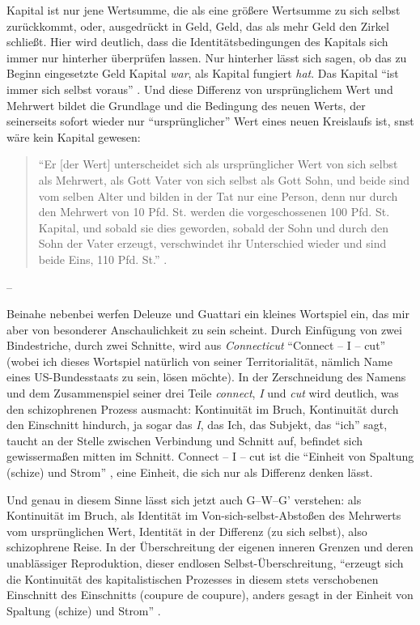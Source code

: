 \documentclass[12pt,
               DIV13,
               paper=a4,
               twoside=false,
               onehalfspacing,
               bibliography=totoc,
               toc=graduated,
               draft,
               ]{scrartcl}
\newcommand{\pc}[2]{\parencite[#1]{#2}}
\newcommand{\worries}[1]{\ifdraft{\textcolor{blue}{\texttt{(#1)}}}{}}
\newcommand{\gwg}{G--W--G'\xspace}
\begin{document}
Kapital ist nur jene Wertsumme, die als eine größere Wertsumme zu sich
selbst zurückkommt, oder, ausgedrückt in Geld, Geld, das als mehr Geld
den Zirkel schließt. \worries{Falte} Hier wird deutlich, dass die
Identitätsbedingungen des Kapitals sich immer nur hinterher überprüfen
lassen. Nur hinterher lässt sich sagen, ob das zu Beginn eingesetzte
Geld Kapital \emph{war}, als Kapital fungiert \emph{hat}. Das Kapital
"`ist immer sich selbst voraus"' \pc{125}{strauss}. Und diese
Differenz von ursprünglichem Wert und Mehrwert bildet die Grundlage
und die Bedingung des neuen Werts, der seinerseits sofort wieder nur
"`ursprünglicher"' Wert eines neuen Kreislaufs ist, snst wäre kein
Kapital gewesen:
%
\begin{spacing}{1}
\begin{quote}
"`Er [der Wert] unterscheidet sich als ursprünglicher
Wert von sich selbst als Mehrwert, als Gott Vater von sich selbst als
Gott Sohn, und beide sind vom selben Alter und bilden in der Tat nur
eine Person, denn nur durch den Mehrwert von 10 Pfd. St. werden die
vorgeschossenen 100 Pfd. St. Kapital, und sobald sie dies geworden,
sobald der Sohn und durch den Sohn der Vater erzeugt, verschwindet ihr
Unterschied wieder und sind beide Eins, 110 Pfd. St."' \pc{S. 169
f.}{kap}.
\end{quote}
\end{spacing}

--

Beinahe nebenbei werfen Deleuze und Guattari ein kleines Wortspiel
ein, das mir aber von besonderer Anschaulichkeit zu sein scheint.
Durch Einfügung von zwei Bindestriche, durch zwei Schnitte, wird aus
\emph{Connecticut} "`Connect -- I -- cut"' \pc{48}{ao} (wobei ich
dieses Wortspiel natürlich von seiner Territorialität, nämlich Name
eines US-Bundesstaats zu sein, lösen möchte). In der Zerschneidung des
Namens und dem Zusammenspiel seiner drei Teile \emph{connect},
\emph{I} und \emph{cut} wird deutlich, was den schizophrenen Prozess
ausmacht: Kontinuität im Bruch, Kontinuität durch den Einschnitt
hindurch, ja sogar das \emph{I}, das Ich, das Subjekt, das "`ich"'
sagt, taucht an der Stelle zwischen Verbindung und Schnitt auf,
befindet sich gewissermaßen mitten im Schnitt. Connect -- I -- cut ist
die "`Einheit von Spaltung (schize) und Strom"' \pc{296}{ao}, eine
Einheit, die sich nur als Differenz denken lässt.

Und genau in diesem Sinne lässt sich jetzt auch \gwg verstehen: als
Kontinuität im Bruch, als Identität im Von-sich-selbst-Abstoßen des
Mehrwerts vom ursprünglichen Wert, Identität in der Differenz (zu sich
selbst), also schizophrene Reise. In der Überschreitung der eigenen
inneren Grenzen und deren unablässiger Reproduktion, dieser endlosen
Selbst-Ü\-ber\-schrei\-tung, "`erzeugt sich die Kontinuität des
kapitalistischen Prozesses in diesem stets verschobenen Einschnitt des
Einschnitts (coupure de coupure), anders gesagt in der Einheit von
Spaltung (schize) und Strom"' \pc{296}{ao}.
\end{document}

